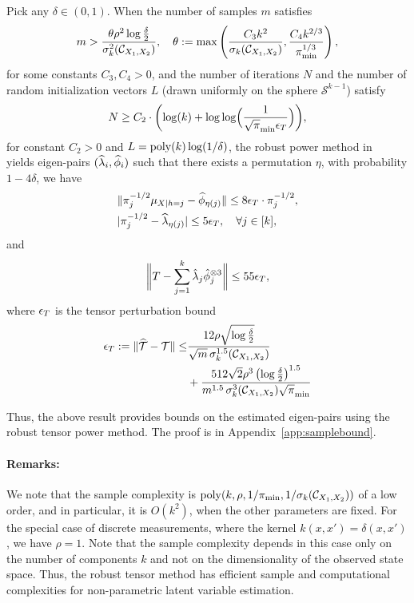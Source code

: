 \documentclass{article}
\begin{document}
\begin{theorem}\label{thm:samplebound}
Pick  any $\delta\in (0,1)$. When the number of samples $m$ satisfies
\[ m >\frac{\theta\rho^2  \log\frac{\delta}{2}}{\sigma^2_k(\Ccal_{X_1, X_2})},
\quad \theta:= \max\left(\frac{C_3 k^2}{\sigma_k( \Ccal_{X_1, X_2})}, \frac{C_4k^{2/3}\iffalse(1+\sigma_{k+1}(\Ccal_{X_1, X_2}))^2 \fi }{\pi_{\min}^{1/3}}\right),\] for some constants $C_3, C_4>0$, and the number of iterations $N$  and  the number of random initialization vectors $L$  (drawn uniformly on the sphere $\mathcal{S}^{k-1}$)  satisfy
\begin{align*}
  N \geq C_2 \cdot \biggl( \log(k) + \log\log\Bigl(
 \frac{1}{\sqrt{\pi}_{\min}\epsilon_T} \Bigr) \biggr),
\end{align*}
for constant $C_2>0$ and  $L = \operatorname{poly}(k) \log(1/\delta)$,  the robust power method in~\cite{AnandkumarEtal:community12} yields eigen-pairs $(\widehat{\lambda}_i, \widehat{\phi}_i)$ such that there exists a permutation $\eta$, with probability $1-4\delta$, we have
\begin{align*}
&\|\pi^{-1/2}_{j} \mu_{X|h=j}-\widehat{\phi}_{\eta(j)}\| \leq 8 \epsilon_T \cdot\pi^{-1/2}_{j}
, \\
&|\pi^{-1/2}_{j}-\widehat{\lambda}_{\eta(j)}| \leq  5\epsilon_T, \quad \forall j \in [k]
,
\end{align*}
and
\[
\biggl\|
T - \sum_{j=1}^k \hat\lambda_j \hat{\phi}_j^{\otimes 3}
\biggr\| \leq 55\epsilon_T,
\] where $\epsilon_T$ is the tensor perturbation bound
\begin{align*} \epsilon_T := \|\widehat{{\mathcal{T}}} - {\mathcal{T}}\| \leq&
\frac{12 \rho \sqrt{\log\frac{\delta}{2}}}{\sqrt{m} \, \sigma_k^{1.5}(\mathcal{C}_{X_1, X_2})} \\ &+ \frac{512 \sqrt{2} \rho^3 \left(\log\frac{\delta}{2}\right)^{1.5}}{m^{1.5} \,\sigma_k^{3}(\mathcal{C}_{X_1, X_2}) \sqrt{\pi}_{\min}}\end{align*}
\end{theorem}

Thus, the above result provides bounds on the estimated eigen-pairs using the robust tensor power method.
The proof is in Appendix~\ref{app:samplebound}.

\paragraph{Remarks: }We note that the sample complexity is  $\operatorname{poly}(k, \rho, 1/\pi_{\min}, 1/\sigma_k(\mathcal{C}_{X_1, X_2}))$ of a low order, and in particular,  it is $O(k^2)$, when the other parameters are fixed. For the special case of discrete measurements, where the kernel $k(x,x')=\delta(x,x')$, we have $\rho=1$. Note that the sample complexity depends in this case only on the number of components $k$ and not on the dimensionality of the observed state space.   Thus, the robust tensor method has efficient sample and computational complexities for non-parametric latent variable estimation.
\end{document}
